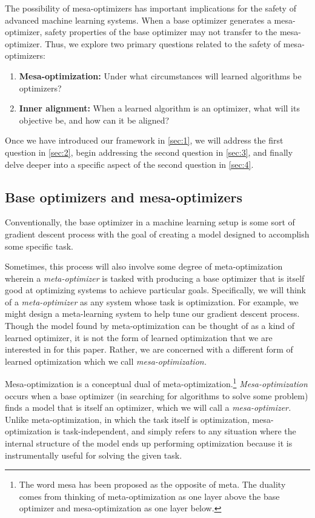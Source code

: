 \documentclass[
  onecolumn,
  natbib,
]{miri-tech-article}
\begin{document}
The possibility of mesa-optimizers has important implications for the safety of advanced machine learning systems. When a base optimizer generates a mesa-optimizer, safety properties of the base optimizer may not transfer to the mesa-optimizer. Thus, we explore two primary questions related to the safety of mesa-optimizers:
\begin{enumerate}
\item \textbf{Mesa-optimization:} Under what circumstances will learned algorithms be optimizers?
\item \textbf{Inner alignment:} When a learned algorithm is an optimizer, what will its objective be, and how can it be aligned?
\end{enumerate}
Once we have introduced our framework in \cref{sec:1}, we will address the first question in \cref{sec:2}, begin addressing the second question in \cref{sec:3}, and finally delve deeper into a specific aspect of the second question in \cref{sec:4}.

\subsection{Base optimizers and mesa-optimizers}
\label{sec:1.1}

Conventionally, the base optimizer in a machine learning setup is some sort of gradient descent process with the goal of creating a model designed to accomplish some specific task.

Sometimes, this process will also involve some degree of meta-optimization wherein a \textit{meta-optimizer} is tasked with producing a base optimizer that is itself good at optimizing systems to achieve particular goals. Specifically, we will think of a \textit{meta-optimizer} as any system whose task is optimization. For example, we might design a meta-learning system to help tune our gradient descent process.\cite{grad_by_grad} Though the model found by meta-optimization can be thought of as a kind of learned optimizer, it is not the form of learned optimization that we are interested in for this paper. Rather, we are concerned with a different form of learned optimization which we call \textit{mesa-optimization.}

Mesa-optimization is a conceptual dual of meta-optimization.\footnote{The word mesa has been proposed as the opposite of meta.\cite{mesa} The duality comes from thinking of meta-optimization as one layer above the base optimizer and mesa-optimization as one layer below.} \textit{Mesa-optimization} occurs when a base optimizer (in searching for algorithms to solve some problem) finds a model that is itself an optimizer, which we will call a \textit{mesa-optimizer.} Unlike meta-optimization, in which the task itself is optimization, mesa-optimization is task-independent, and simply refers to any situation where the internal structure of the model ends up performing optimization because it is instrumentally useful for solving the given task.
\end{document}
